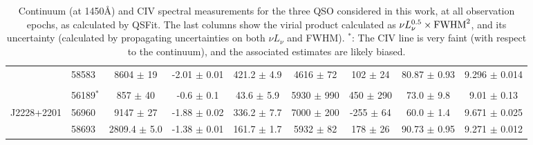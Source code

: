 \begin{table*}
\begin{centering}
\begin{tabular}{l | l | c c | c c c c | c}
                       &  58583       &    8604    $\pm$   19    &  -2.01 $\pm$ 0.01                       &  421.2    $\pm$  4.9     &  4616 $\pm$   72     &     102    $\pm$   24      &   80.87 $\pm$  0.93  &  9.296 $\pm$ 0.014\\
                       &              &                          &                                         &                          &                      &                            &                      &                  \\
                       &  56189$^*$   &     857    $\pm$   40    &  -0.6  $\pm$ 0.1                        &   43.6    $\pm$  5.9     &  5930 $\pm$  990     &     450    $\pm$  290      &   73.0  $\pm$  9.8   &  9.01  $\pm$ 0.13 \\
          J2228+2201   &  56960       &    9147    $\pm$   27    &  -1.88 $\pm$ 0.02                       &  336.2    $\pm$  7.7     &  7000 $\pm$  200     &    -255    $\pm$   64      &   60.0  $\pm$  1.4   &  9.671 $\pm$ 0.025\\
                       &  58693       &    2809.4  $\pm$    5.0  &  -1.38 $\pm$ 0.01                       &  161.7    $\pm$  1.7     &  5932 $\pm$   82     &     178    $\pm$   26      &   90.73 $\pm$  0.95  &  9.271 $\pm$ 0.012\\
      \hline
      \hline
    \end{tabular}
    \caption{Continuum (at 1450\AA) and CIV spectral measurements for the three QSO considered in this work, at all observation epochs, as calculated by QSFit.  The last columns show the virial product calculated as $\nu L_{\nu}^{0.5} \times {\rm FWHM}^2$, and its uncertainty (calculated by propagating uncertainties on both $\nu L_{\nu}$ and FWHM).  $^*$: The CIV line is very faint (with respect to the continuum), and the associated estimates are likely biased.}
    \label{tab:QSFit-results}
  \end{centering}
\end{table*}